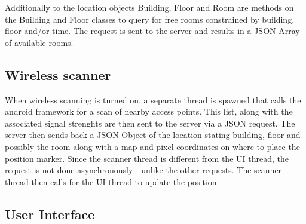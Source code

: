 Additionally to the location objects Building, Floor and Room are methods on the Building and Floor classes to query for free rooms constrained by building, floor and/or time. The request is sent to the server and results in a JSON Array of available rooms.

\subsection{Wireless scanner}
When wireless scanning is turned on, a separate thread is spawned that calls the android framework for a scan of nearby access points. This list, along with the associated signal strenghts are then sent to the server via a JSON request. The server then sends back a JSON Object of the location stating building, floor and possibly the room along with a map and pixel coordinates on where to place the position marker. Since the scanner thread is different from the UI thread, the request is not done asynchronously - unlike the other requests. The scanner thread then calls for the UI thread to update the position.

\subsection{User Interface}

